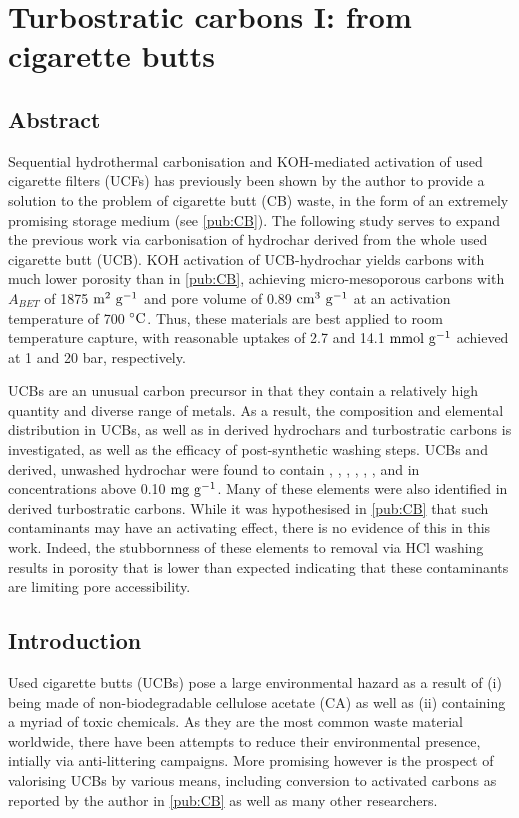 \chapter{Turbostratic carbons I: from cigarette butts}
\label{ch:cbs}

\newpage
\section*{Abstract}

Sequential hydrothermal carbonisation and KOH-mediated activation of used cigarette filters (UCFs) has previously been shown by the author to provide a solution to the problem of cigarette butt (CB) waste, in the form of an extremely promising  storage medium (see \ref{pub:CB}). The following study serves to expand the previous work via carbonisation of hydrochar derived from the whole used cigarette butt (UCB). KOH activation of UCB-hydrochar yields carbons with much lower porosity than in \ref{pub:CB}, achieving micro-mesoporous carbons with $A_{BET}$ of 1875 $\rm m^2\ g^{-1}$ and pore volume of 0.89 $\rm cm^3\ g^{-1}$ at an activation temperature of 700 $\rm ^{\circ}C$. Thus, these materials are best applied to room temperature  capture, with reasonable uptakes of 2.7 and 14.1 $\rm mmol\ g^{-1}$ achieved at 1 and 20 bar, respectively.

UCBs are an unusual carbon precursor in that they contain a relatively high quantity and diverse range of metals. As a result, the composition and elemental distribution in UCBs, as well as in derived hydrochars and turbostratic carbons is investigated, as well as the efficacy of post-synthetic washing steps. UCBs and derived, unwashed hydrochar were found to contain , , , , , , and  in concentrations above 0.10 $\rm mg\ g^{-1}$. Many of these elements were also identified in derived turbostratic carbons. While it was hypothesised in \ref{pub:CB} that such contaminants may have an activating effect, there is no evidence of this in this work. Indeed, the stubbornness of these elements to removal via HCl washing results in porosity that is lower than expected indicating that these contaminants are limiting pore accessibility.

\newpage
\section{Introduction}

Used cigarette butts (UCBs) pose a large environmental hazard as a result of (i) being made of non-biodegradable cellulose acetate (CA) as well as (ii) containing a myriad of toxic chemicals.\citep{Slaughter2011, Puls2011, chevalier2018nano} As they are the most common waste material worldwide, there have been attempts to reduce their environmental presence, intially via anti-littering campaigns.\citep{Prevention2011, Harris2011} More promising however is the prospect of valorising UCBs by various means, including conversion to activated carbons as reported by the author in \ref{pub:CB} as well as many other researchers.\citep{Soltani, Soltani2013, lima2018, xiong2019nitrogen, Lee2014, Hamzah2017, Yu2018, Wang2016a, Koochaki2019, Bilge2019}


